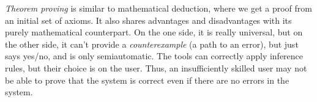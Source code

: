 {\em Theorem proving} is similar to mathematical deduction, where we get a proof from an initial set of axioms. It also shares advantages and disadvantages with its purely mathematical counterpart. On the one side, it is really universal, but on the other side, it can't provide a {\em counterexample} (a path to an error), but just says yes/no, and is only semiautomatic. The tools can correctly apply inference rules, but their choice is on the user. Thus, an insufficiently skilled user may not be able to prove that the system is correct even if there are no errors in the system.


